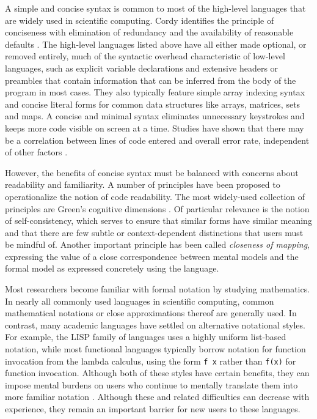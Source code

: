 \documentclass[12pt]{article}
\begin{document}
A simple and concise syntax is common to most of the high-level languages that are widely used in scientific computing. Cordy identifies the principle of conciseness with elimination of redundancy and the availability of reasonable defaults \cite{cordy1992hints}. The high-level languages listed above have all either made optional, or removed entirely, much of the syntactic overhead characteristic of low-level languages, such as explicit variable declarations and extensive headers or preambles that contain information that can be inferred from the body of the program in most cases. They also typically feature simple array indexing syntax and concise literal forms for common data structures like arrays, matrices, sets and maps. A concise and minimal syntax eliminates unnecessary keystrokes and keeps more code visible on screen at a time. Studies have shown that there may be a correlation between lines of code entered and overall error rate, independent of other factors \cite{el2001confounding}. 

However, the benefits of concise syntax must be balanced with concerns about readability and familiarity. A number of principles have been proposed to operationalize the notion of code readability. The most widely-used collection of principles are Green's cognitive dimensions \cite{green1996usability}. Of particular relevance is the notion of self-consistency, which serves to ensure that similar forms have similar meaning and that there are few subtle or context-dependent distinctions that users must be mindful of. Another important principle has been called {\it closeness of mapping}, expressing the value of a close correspondence between mental models and the formal model as expressed concretely using the language.

Most researchers become familiar with formal notation by studying mathematics. In nearly all commonly used languages in scientific computing, common mathematical notations or close approximations thereof are generally used. In contrast, many academic languages have settled on alternative notational styles. For example, the LISP family of languages uses a highly uniform list-based notation, while most functional languages typically borrow notation for function invocation from the lambda calculus, using the form \verb|f x| rather than \verb|f(x)| for function invocation. Although both of these styles have certain benefits, they can impose mental burdens on users who continue to mentally translate them into more familiar notation \cite{anderson1985novice}. Although these and related difficulties can decrease with experience, they remain an important barrier for new users to these languages.
\end{document}
